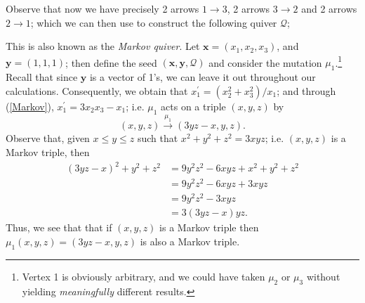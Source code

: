 Observe that now we have precisely 2 arrows $1 \rightarrow 3$, 2 arrows $3 \rightarrow 2$ and 2 arrows $2 \rightarrow 1$; which we can then use to construct the following quiver $\mathcal{Q}$;
\begin{figure}[H]
    \centering
\end{figure}
This is also known as the \emph{Markov quiver}. Let $\mathbf{x} = (x_1,x_2,x_3)$, and $\mathbf{y} = (1,1,1)$; then define the seed $(\mathbf{x},\mathbf{y},\mathcal{Q})$ and consider the mutation $\mu_1$.\footnote{Vertex 1 is obviously arbitrary, and we could have taken $\mu_2$ or $\mu_3$ without yielding \emph{meaningfully} different results.} Recall that since $\mathbf{y}$ is a vector of 1's, we can leave it out throughout our calculations. Consequently, we obtain that $x_1^{'} = (x_2^2 + x_3^2)/x_1$; and through (\ref{Markov}), $x_1^{'} = 3x_2x_3 - x_1$; i.e. $\mu_1$ acts on a triple $(x,y,z)$ by 
\begin{equation}
    (x,y,z) \xrightarrow{\mu_1} (3yz-x,y,z).
\end{equation}
Observe that, given $x\leq y \leq z$ such that $x^2 + y^2 +z^2 = 3xyz$; i.e. $(x,y,z)$ is a Markov triple, then
\begin{align*}
    (3yz-x)^2 + y^2 + z^2 &= 9y^2z^2 - 6xyz + x^2 + y^2 + z^2 \\
    &= 9y^2z^2 - 6xyz + 3xyz \\
    &= 9y^2z^2-3xyz \\
    &= 3(3yz-x)yz.
\end{align*}
Thus, we see that that if $(x,y,z)$ is a Markov triple then $\mu_1(x,y,z) = (3yz-x,y,z)$ is also a Markov triple.

